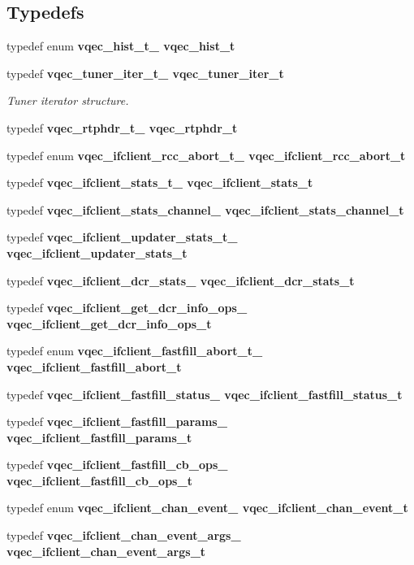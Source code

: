 \subsection*{Typedefs}
\begin{CompactItemize}
\item 
typedef enum \bf{vqec\_\-hist\_\-t\_\-} \bf{vqec\_\-hist\_\-t}
\item 
typedef \bf{vqec\_\-tuner\_\-iter\_\-t\_\-} \bf{vqec\_\-tuner\_\-iter\_\-t}
\begin{CompactList}\small\item\em Tuner iterator structure. \item\end{CompactList}\item 
typedef \bf{vqec\_\-rtphdr\_\-t\_\-} \bf{vqec\_\-rtphdr\_\-t}
\item 
typedef enum \bf{vqec\_\-ifclient\_\-rcc\_\-abort\_\-t\_\-} \bf{vqec\_\-ifclient\_\-rcc\_\-abort\_\-t}
\item 
typedef \bf{vqec\_\-ifclient\_\-stats\_\-t\_\-} \bf{vqec\_\-ifclient\_\-stats\_\-t}
\item 
typedef \bf{vqec\_\-ifclient\_\-stats\_\-channel\_\-} \bf{vqec\_\-ifclient\_\-stats\_\-channel\_\-t}
\item 
typedef \bf{vqec\_\-ifclient\_\-updater\_\-stats\_\-t\_\-} \bf{vqec\_\-ifclient\_\-updater\_\-stats\_\-t}
\item 
typedef \bf{vqec\_\-ifclient\_\-dcr\_\-stats\_\-} \bf{vqec\_\-ifclient\_\-dcr\_\-stats\_\-t}
\item 
typedef \bf{vqec\_\-ifclient\_\-get\_\-dcr\_\-info\_\-ops\_\-} \bf{vqec\_\-ifclient\_\-get\_\-dcr\_\-info\_\-ops\_\-t}
\item 
typedef enum \bf{vqec\_\-ifclient\_\-fastfill\_\-abort\_\-t\_\-} \bf{vqec\_\-ifclient\_\-fastfill\_\-abort\_\-t}
\item 
typedef \bf{vqec\_\-ifclient\_\-fastfill\_\-status\_\-} \bf{vqec\_\-ifclient\_\-fastfill\_\-status\_\-t}
\item 
typedef \bf{vqec\_\-ifclient\_\-fastfill\_\-params\_\-} \bf{vqec\_\-ifclient\_\-fastfill\_\-params\_\-t}
\item 
typedef \bf{vqec\_\-ifclient\_\-fastfill\_\-cb\_\-ops\_\-} \bf{vqec\_\-ifclient\_\-fastfill\_\-cb\_\-ops\_\-t}
\item 
typedef enum \bf{vqec\_\-ifclient\_\-chan\_\-event\_\-} \bf{vqec\_\-ifclient\_\-chan\_\-event\_\-t}
\item 
typedef \bf{vqec\_\-ifclient\_\-chan\_\-event\_\-args\_\-} \bf{vqec\_\-ifclient\_\-chan\_\-event\_\-args\_\-t}

\end{CompactItemize}
